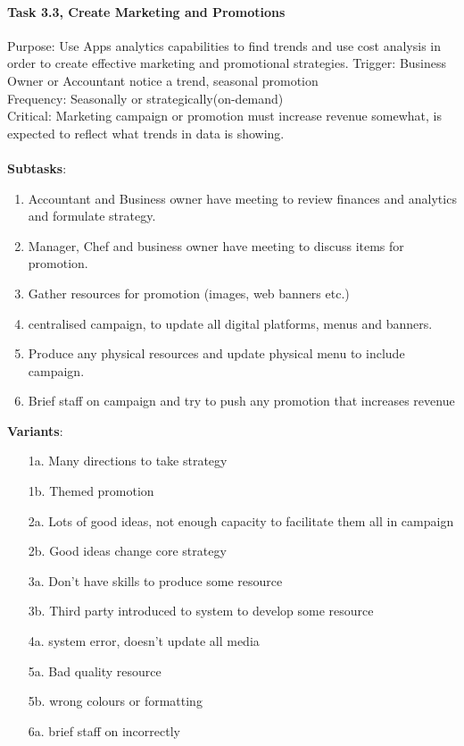 \documentclass{article}
\begin{document}
\paragraph{Task 3.3, Create Marketing and Promotions }
Purpose: Use Apps analytics capabilities to find trends and use cost analysis in order to create effective marketing and promotional strategies.
Trigger: Business Owner or Accountant notice a trend, seasonal promotion\\
Frequency: Seasonally or strategically(on-demand)\\
Critical: Marketing campaign or promotion must increase revenue somewhat, is expected to reflect what trends in data is showing. \\
\\
\textbf{Subtasks}:
\begin{enumerate}
    \item Accountant and Business owner have meeting to review finances and analytics and formulate strategy.
    \item Manager, Chef and business owner have meeting to discuss items for promotion.
    \item Gather resources for promotion (images, web banners etc.) 
    \item centralised campaign, to update all digital platforms, menus and banners.
    \item Produce any physical resources and update physical menu to include campaign.
    \item Brief staff on campaign and try to push any promotion that increases revenue
\end{enumerate}
\textbf{Variants}:
\begin{enumerate}
    \item [1a.] Many directions to take strategy
    \item [1b.] Themed promotion
    \item [2a.] Lots of good ideas, not enough capacity to facilitate them all in campaign
    \item [2b.] Good ideas change core strategy
    \item [3a.] Don't have skills to produce some resource 
    \item [3b.] Third party introduced to system to develop some resource
    \item [4a.] system error, doesn't update all media
    \item [5a.] Bad quality resource
    \item [5b.] wrong colours or formatting
    \item [6a.] brief staff on incorrectly
\end{enumerate}
\clearpage
\end{document}
